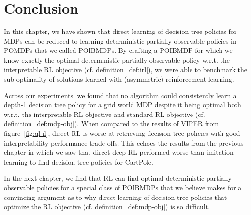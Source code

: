 \section{Conclusion}
In this chapter, we have shown that direct learning of decision tree policies for MDPs can be reduced to learning deterministic partially observable policies in POMDPs that we called POIBMDPs.
By crafting a POIBMDP for which we know exactly the optimal deterministic partially observable policy w.r.t. the interpretable RL objective (cf. definition~\ref{def:irl}), we were able to benchmark the sub-optimality of solutions learned with (asymmetric) reinforcement learning.

Across our experiments, we found that no algorithm could consistently learn a depth-1 decision tree policy for a grid world MDP despite it being optimal both w.r.t. the interpretable RL objective and standard RL objective (cf. definition~\ref{def:mdp-obj}).
When compared to the results of VIPER from figure~\ref{fig:ql-il}, direct RL is worse at retrieving decision tree policies with good interpretability-performance trade-offs.
This echoes the results from the previous chapter in which we saw that direct deep RL performed worse than imitation learning to find decision tree policies for CartPole.

In the next chapter, we find that RL can find optimal deterministic partially observable policies for a special class of POIBMDPs that we believe makes for a convincing argument as to why direct learning of decision tree policies that optimize the RL objective (cf. definition~\ref{def:mdp-obj}) is so difficult.
